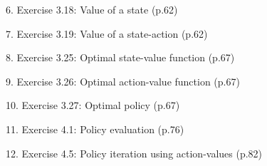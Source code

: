 \documentclass[12pt,letterpaper]{exam}
\newcommand\chapter{2}
\begin{document}
\begin{questions}
6. Exercise 3.18: Value of a state (p.62)

\question%
\emph{}
\begin{solution}
\end{solution}

7. Exercise 3.19: Value of a state-action (p.62)

\question%
\emph{}
\begin{solution}
\end{solution}

8. Exercise 3.25: Optimal state-value function (p.67)

\question%
\emph{}
\begin{solution}
\end{solution}

9. Exercise 3.26: Optimal action-value function (p.67)

\question%
\emph{}
\begin{solution}
\end{solution}

10. Exercise 3.27: Optimal policy (p.67)

\question%
\emph{}
\begin{solution}
\end{solution}


\renewcommand\chapter{4}
11. Exercise 4.1: Policy evaluation (p.76)

\question%
\emph{}
\begin{solution}
\end{solution}

12. Exercise 4.5: Policy iteration using action-values (p.82)

\question%
\emph{}
\begin{solution}
\end{solution}


\end{questions}
\end{document}
